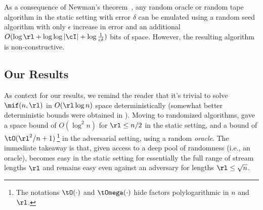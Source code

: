 \begin{itemize}
\begin{itemize}
As a consequence of Newman's theorem~\cite{Newman91}, any random oracle or
random tape algorithm in the static setting with error $\delta$ can be
emulated using a random seed algorithm with only $\epsilon$ increase in error
and an additional $O(\log \rl + \log \log |\cI| + \log \frac{1}{\epsilon
\delta})$ bits of space. However, the resulting algorithm is non-constructive.

\subsection{Our Results}\label{subsec:results}

As context for our results, we remind the reader that it's trivial to solve
$\mif(n,\rl)$ in $O(\rl\log n)$ space deterministically (somewhat better
deterministic bounds were obtained in \cite{Stoeckl23}). Moving to randomized
algorithms, \cite{Stoeckl23} gave a space bound of $O(\log^2 n)$ for $\rl
\le n/2$ in the static setting, and a bound of $\tO(\rl^2/n + 1)$\,\footnote{The
notations $\tO(\cdot)$ and $\tOmega(\cdot)$ hide factors polylogarithmic in
$n$ and $\rl$.} in the adversarial setting, using a random \emph{oracle}. The
immediate takeaway is that, given access to a deep pool of randomness (i.e.,
an oracle), \mif becomes easy in the static setting for essentially the full
range of stream lengths $\rl$ and remains easy even against an adversary for
lengths $\rl \le \sqrt{n}$.


\end{itemize}
\end{itemize}
